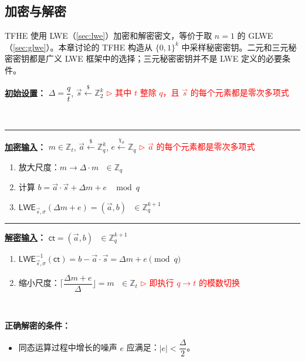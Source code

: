 \clearpage

\subsection{加密与解密}
\label{subsec:tfhe-enc-dec}

TFHE 使用 LWE（\autoref{sec:lwe}）加密和解密密文，等价于取 $n=1$ 的 GLWE（\autoref{sec:glwe}）。本章讨论的 TFHE 构造从 $\{0,1\}^k$ 中采样秘密密钥。二元和三元秘密密钥都是广义 LWE 框架中的选择；三元秘密密钥并不是 LWE 定义的必要条件。


\begin{tcolorbox}[title={\textbf{\tboxlabel{\ref*{subsec:tfhe-enc-dec}} TFHE 加密与解密}}]
\textbf{\underline{初始设置}：} $\Delta = \dfrac{q}{t}$, $\vec{s} \xleftarrow{\$} \mathbb{Z}_2^k$  \textcolor{red}{ $\rhd$ 其中 $t$ 整除 $q$，且 $\vec{s}$ 的每个元素都是零次多项式}

$ $

\par\noindent\rule{\textwidth}{0.4pt}

\textbf{\underline{加密输入}：} $m \in \mathbb{Z}_t$, $\vec{a} \xleftarrow{\$} \mathbb{Z}_q^k$, $e \xleftarrow{\chi_\sigma} \mathbb{Z}_q$ \textcolor{red}{ $\rhd$ $\vec{a}$ 的每个元素都是零次多项式}
\begin{enumerate}
\item 放大尺度：$m \longrightarrow \Delta \cdot m \text{ } \in \mathbb{Z}_q$

\item 计算 $b = \vec{a} \cdot \vec{s} + \Delta  m + e \text{ } \bmod q$
\item $\textsf{LWE}_{\vec{s},\sigma}(\Delta  m + e) = (\vec{a}, b) \text{ } \in \mathbb{Z}_q^{k + 1}$ 
\end{enumerate}

\par\noindent\rule{\textwidth}{0.4pt}

\textbf{\underline{解密输入}：} $\textsf{ct} = (\vec{a}, b) \text{ } \in \mathbb{Z}_q^{k+1}$
\begin{enumerate}
\item $\textsf{LWE}^{-1}_{\vec{s},\sigma}(\textsf{ct}) = b - \vec{a}\cdot \vec{s} = \Delta  m + e  \pmod q$

\item 缩小尺度：$\Bigg\lceil\dfrac{ \Delta  m + e } {\Delta}\Bigg\rfloor = m \text{ } \in \mathbb{Z}_t$ \textcolor{red}{ $\rhd$ 即执行 $q \rightarrow t$ 的模数切换}
\end{enumerate}

$ $

\textbf{{正确解密的条件}：}
\begin{itemize}
\item 同态运算过程中增长的噪声 $e$ 应满足：$|e| < \dfrac{\Delta}{2}$。
\end{itemize}

\end{tcolorbox}

